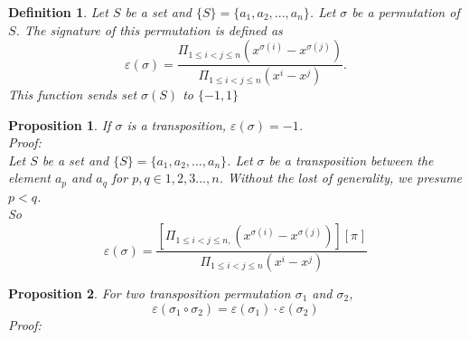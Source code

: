 \documentclass[12pt,letterpaper]{article}
\newtheorem{mydef}{Definition}
\newtheorem{prop}{Proposition}
\begin{document}
\begin{mydef}\label{def:def444}
Let $S$ be a set and $\{S\}=\{a_1,a_2,...,a_n\}$. Let $\sigma$ be a permutation of $S$. The signature of this permutation is defined as 
$$\varepsilon(\sigma)=\frac{\Pi_{1 \leq i<j \leq n }(x^{\sigma(i)}-x^{\sigma(j)})}{\Pi_{1 \leq i<j \leq n }(x^{i}-x^{j})}.$$
This function sends set $\sigma(S)$ to $\{-1,1\}$
\end{mydef}
\newpage
\begin{prop}
If $\sigma$ is a transposition, $\varepsilon(\sigma)=-1$. \\
Proof: \\
Let $S$ be a set and $\{S\}=\{a_1,a_2,...,a_n\}$. Let $\sigma$ be a transposition between the element $a_p$ and $a_q$ for $p,q \in {1,2,3...,n}$. Without the lost of generality, we presume $p<q$.  \\
So $$\varepsilon(\sigma)=\frac{
[\Pi_{1 \leq i<j \leq n,}(x^{\sigma(i)}-x^{\sigma(j)})][\pi_{}]}
{\Pi_{1 \leq i<j \leq n }(x^{i}-x^{j})}$$


\end{prop}

\begin{prop}
For two transposition permutation $\sigma_1$ and $\sigma_2$,
$$\varepsilon(\sigma_1 \circ \sigma_2)=\varepsilon(\sigma_1) \cdot \varepsilon(\sigma_2) $$ 
Proof: \\

\end{prop}
\end{document}
